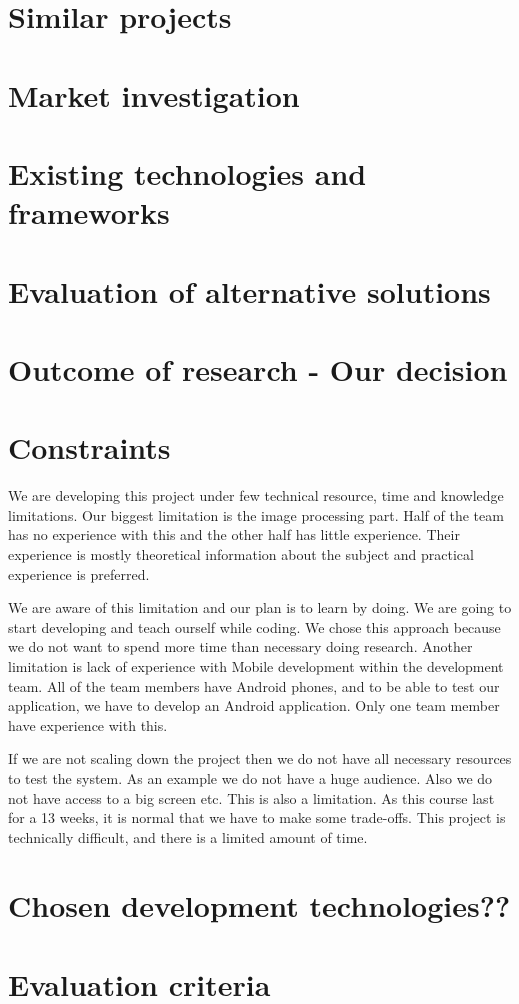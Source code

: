 \section{Similar projects}
\section{Market investigation}
\section{Existing technologies and frameworks}
\section{Evaluation of alternative solutions}
\section{Outcome of research - Our decision}
\section{Constraints}
We are developing this project under few technical resource, time and knowledge limitations.
Our biggest limitation is the image processing part.
Half of the team has no experience with this and the other half has little experience.
Their experience is mostly theoretical information about the subject and practical experience is preferred. 

We are aware of this limitation and our plan is to learn by doing.
We are going to start developing and teach ourself while coding.
We chose this approach because we do not want to spend more time than necessary doing research.
Another limitation is lack of experience with Mobile development within the
development team. All of the team members have Android phones, and to be
able to test our application, we have to develop an Android application. Only
one team member have experience with this.

If we are not scaling down the project then we do not have all necessary resources to test the system. As an example we do not have a huge audience.
Also we do not have access to a big screen etc. This is also a limitation.
As this course last for a 13 weeks, it is normal that we have to make some
trade-offs. This project is technically difficult, and there is a limited amount of
time.
\section{Chosen development technologies??}
\section{Evaluation criteria}